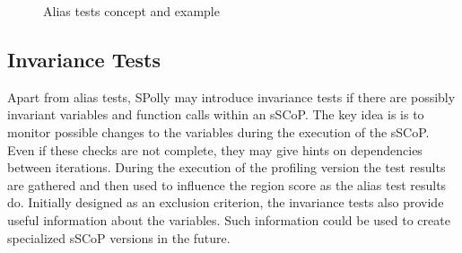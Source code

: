 \begin{figure}[htbp]
  \centering
  
  \caption{Alias tests concept and example}
  \label{fig:Aliastest}  
\end{figure}
\resetlst





\subsection{Invariance Tests}
Apart from alias tests, SPolly may introduce invariance tests if there are
possibly invariant variables and function calls within an sSCoP. The key idea is 
is to monitor possible changes to the variables during the execution of the 
sSCoP. Even if these checks are not complete, they may give hints on dependencies 
between iterations. 
During the execution of the profiling version the test results are gathered 
and then used to influence the region score as the alias test results do.
Initially designed as an exclusion criterion, the invariance tests also provide
useful information about the variables. Such information could be used to
create specialized sSCoP versions in the future.

